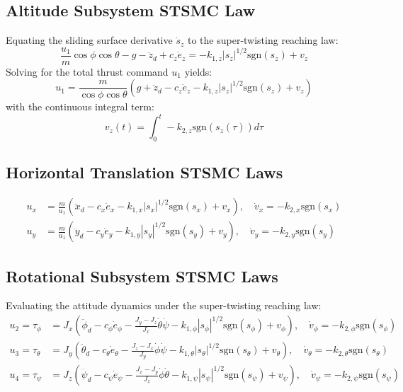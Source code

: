 \subsection{Altitude Subsystem STSMC Law}
Equating the sliding surface derivative $\dot{s}_z$ to the super-twisting reaching law:
\begin{equation}
\frac{u_1}{m}\cos\phi\cos\theta - g - \ddot{z}_d + c_z \dot{e}_z = -k_{1,z} |s_z|^{1/2} \text{sgn}(s_z) + v_z
\end{equation}
Solving for the total thrust command $u_1$ yields:
\begin{equation}
u_1 = \frac{m}{\cos\phi \cos\theta} \left( g + \ddot{z}_d - c_z \dot{e}_z - k_{1,z} |s_z|^{1/2} \text{sgn}(s_z) + v_z \right)
\end{equation}
with the continuous integral term:
\begin{equation}
v_z(t) = \int_{0}^{t} -k_{2,z} \text{sgn}(s_z(\tau)) d\tau
\end{equation}

\subsection{Horizontal Translation STSMC Laws}
\begin{align}
u_x &= \frac{m}{u_1} \left( \ddot{x}_d - c_x \dot{e}_x - k_{1,x} |s_x|^{1/2} \text{sgn}(s_x) + v_x \right), \quad \dot{v}_x = -k_{2,x} \text{sgn}(s_x) \\
u_y &= \frac{m}{u_1} \left( \ddot{y}_d - c_y \dot{e}_y - k_{1,y} |s_y|^{1/2} \text{sgn}(s_y) + v_y \right), \quad \dot{v}_y = -k_{2,y} \text{sgn}(s_y)
\end{align}

\subsection{Rotational Subsystem STSMC Laws}
Evaluating the attitude dynamics under the super-twisting reaching law:
\begin{align}
u_2 = \tau_{\phi} &= J_x \left( \ddot{\phi}_d - c_{\phi} \dot{e}_{\phi} - \frac{J_y - J_z}{J_x}\dot{\theta}\dot{\psi} - k_{1,\phi}|s_{\phi}|^{1/2}\text{sgn}(s_{\phi}) + v_{\phi} \right), \quad \dot{v}_{\phi} = -k_{2,\phi}\text{sgn}(s_{\phi}) \\
u_3 = \tau_{\theta} &= J_y \left( \ddot{\theta}_d - c_{\theta} \dot{e}_{\theta} - \frac{J_z - J_x}{J_y}\dot{\phi}\dot{\psi} - k_{1,\theta}|s_{\theta}|^{1/2}\text{sgn}(s_{\theta}) + v_{\theta} \right), \quad \dot{v}_{\theta} = -k_{2,\theta}\text{sgn}(s_{\theta}) \\
u_4 = \tau_{\psi} &= J_z \left( \ddot{\psi}_d - c_{\psi} \dot{e}_{\psi} - \frac{J_x - J_y}{J_z}\dot{\phi}\dot{\theta} - k_{1,\psi}|s_{\psi}|^{1/2}\text{sgn}(s_{\psi}) + v_{\psi} \right), \quad \dot{v}_{\psi} = -k_{2,\psi}\text{sgn}(s_{\psi})
\end{align}

